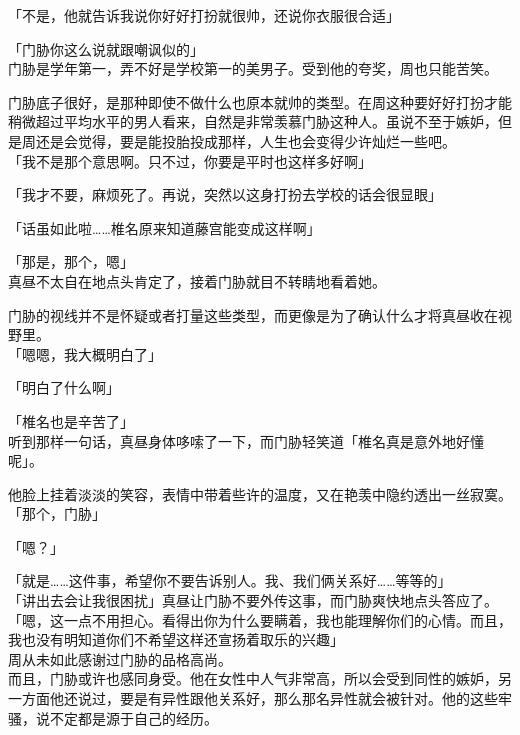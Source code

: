 「不是，他就告诉我说你好好打扮就很帅，还说你衣服很合适」

「门胁你这么说就跟嘲讽似的」\\

门胁是学年第一，弄不好是学校第一的美男子。受到他的夸奖，周也只能苦笑。

门胁底子很好，是那种即使不做什么也原本就帅的类型。在周这种要好好打扮才能稍微超过平均水平的男人看来，自然是非常羡慕门胁这种人。虽说不至于嫉妒，但是周还是会觉得，要是能投胎投成那样，人生也会变得少许灿烂一些吧。\\

「我不是那个意思啊。只不过，你要是平时也这样多好啊」

「我才不要，麻烦死了。再说，突然以这身打扮去学校的话会很显眼」

「话虽如此啦……椎名原来知道藤宫能变成这样啊」

「那是，那个，嗯」\\

真昼不太自在地点头肯定了，接着门胁就目不转睛地看着她。

门胁的视线并不是怀疑或者打量这些类型，而更像是为了确认什么才将真昼收在视野里。\\

「嗯嗯，我大概明白了」

「明白了什么啊」

「椎名也是辛苦了」\\

听到那样一句话，真昼身体哆嗦了一下，而门胁轻笑道「椎名真是意外地好懂呢」。

他脸上挂着淡淡的笑容，表情中带着些许的温度，又在艳羡中隐约透出一丝寂寞。\\

「那个，门胁」

「嗯？」

「就是……这件事，希望你不要告诉别人。我、我们俩关系好……等等的」\\

「讲出去会让我很困扰」真昼让门胁不要外传这事，而门胁爽快地点头答应了。\\

「嗯，这一点不用担心。看得出你为什么要瞒着，我也能理解你们的心情。而且，我也没有明知道你们不希望这样还宣扬着取乐的兴趣」\\

周从未如此感谢过门胁的品格高尚。\\

而且，门胁或许也感同身受。他在女性中人气非常高，所以会受到同性的嫉妒，另一方面他还说过，要是有异性跟他关系好，那么那名异性就会被针对。他的这些牢骚，说不定都是源于自己的经历。\\

